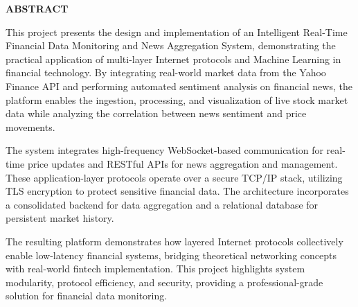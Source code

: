 {}

\begin{center}
    \large{\bf ABSTRACT}
\end{center}

This project presents the design and implementation of an Intelligent Real-Time Financial Data Monitoring and News Aggregation System, demonstrating the practical application of multi-layer Internet protocols and Machine Learning in financial technology. By integrating real-world market data from the Yahoo Finance API and performing automated sentiment analysis on financial news, the platform enables the ingestion, processing, and visualization of live stock market data while analyzing the correlation between news sentiment and price movements.

The system integrates high-frequency WebSocket-based communication for real-time price updates and RESTful APIs for news aggregation and management. These application-layer protocols operate over a secure TCP/IP stack, utilizing TLS encryption to protect sensitive financial data. The architecture incorporates a consolidated backend for data aggregation and a relational database for persistent market history.

The resulting platform demonstrates how layered Internet protocols collectively enable low-latency financial systems, bridging theoretical networking concepts with real-world fintech implementation. This project highlights system modularity, protocol efficiency, and security, providing a professional-grade solution for financial data monitoring.